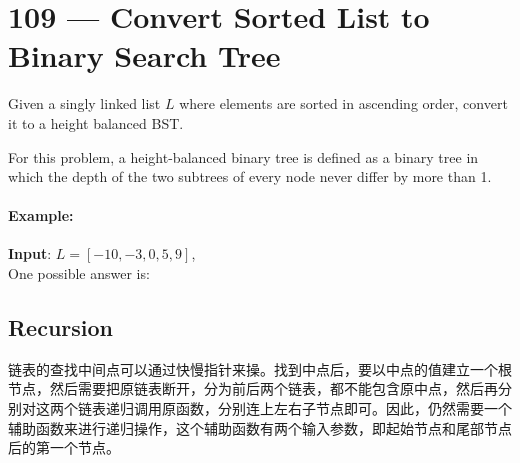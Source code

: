 \section{109 --- Convert Sorted List to Binary Search Tree}
Given a singly linked list $L$ where elements are sorted in ascending order, convert it to a height balanced BST.
\par
For this problem, a height-balanced binary tree is defined as a binary tree in which the depth of the two subtrees of every node never differ by more than 1.
\paragraph{Example:}
\begin{flushleft}
\textbf{Input}: $L = [-10,-3,0,5,9]$,
\\
One possible answer is:
\begin{figure}[H]
\end{figure}
 \end{flushleft}
 \subsection{Recursion}
 \begin{CJK*}{UTF8}{gbsn}
 链表的查找中间点可以通过快慢指针来操。找到中点后，要以中点的值建立一个根节点，然后需要把原链表断开，分为前后两个链表，都不能包含原中点，然后再分别对这两个链表递归调用原函数，分别连上左右子节点即可。因此，仍然需要一个辅助函数来进行递归操作，这个辅助函数有两个输入参数，即起始节点和尾部节点后的第一个节点。
\end{CJK*}
